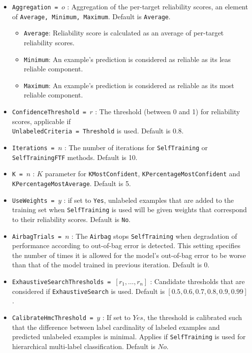 \documentclass[a4paper]{report}
\begin{document}
\begin{itemize}
\begin{itemize}
\end{itemize}
\item {\tt Aggregation = $o$} : Aggregation of the per-target reliability scores, an element of {\tt Average, Minimum, Maximum}. Default is {\tt Average}.
\begin{itemize}
\item {\tt Average}: Reliability score is calculated as an average of per-target reliability scores.
\item {\tt Minimum}: An example's prediction is considered as reliable as its leas reliable component.
\item {\tt Maximum}: An example's prediction is considered as reliable as its most reliable component.
\end{itemize} 
\item {\tt ConfidenceThreshold = $r$} : The threshold (between 0 and 1) for reliability scores, applicable if \\ {\tt UnlabeledCriteria = Threshold} is used. Default is 0.8.
\item {\tt Iterations = $n$} : The number of iterations for {\tt SelfTraining} or {\tt SelfTrainingFTF} methods. Default is 10.
\item {\tt K = $n$} : $K$ parameter for {\tt KMostConfident}, {\tt KPercentageMostConfident} and {\tt KPercentageMostAverage}. Default is 5.
\item {\tt UseWeights = $y$} : if set to {\tt Yes}, unlabeled examples that are added to the training set when {\tt SelfTraining} is used will be given weights that correspond to their reliability scores. Default is {\tt No}.
\item {\tt AirbagTrials = $n$} : The {\tt Airbag} stops {\tt SelfTraining} when degradation of performance according to out-of-bag error is detected. This setting specifies the number of times it is allowed for the model's out-of-bag error to be worse than that of the model trained in previous iteration. Default is 0. 
\item {\tt ExhaustiveSearchThresholds =  $\left[ r_1, \ldots, r_n\right]$} : Candidate thresholds that are considered if {\tt ExhaustiveSearch} is used. Default is $\left[ 0.5,0.6,0.7,0.8,0.9,0.99\right]$.
\item {\tt CalibrateHmcThreshold = $y$} : If set to $Yes$, the threshold is calibrated such that the difference between label cardinality of labeled examples and predicted unlabeled examples is minimal. Applies if {\tt SelfTraining} is used for hierarchical multi-label classification. Default is $No$.

\end{itemize}
\end{document}
